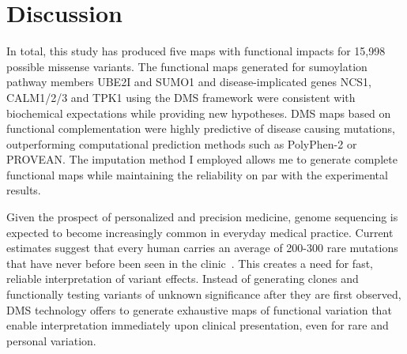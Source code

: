 \section{Discussion}
\label{ch2discussion}

In total, this study has produced five maps with functional impacts for 15,998 possible missense variants. The functional maps generated for sumoylation pathway members UBE2I and SUMO1 and disease-implicated genes NCS1, CALM1/2/3 and TPK1 using the DMS framework were consistent with biochemical expectations while providing new hypotheses. DMS maps based on functional complementation were highly predictive of disease causing mutations, outperforming computational prediction methods such as PolyPhen-2 or PROVEAN.  The imputation method I employed allows me to generate complete functional maps while maintaining the reliability on par with the experimental results. 

Given the prospect of personalized and precision medicine, genome sequencing is expected to become increasingly common in everyday medical practice. Current estimates suggest that every human carries an average of 200-300 rare mutations that have never before been seen in the clinic~\cite{the_1000_genomes_project_consortium_global_2015}. This creates a need for fast, reliable interpretation of variant effects. Instead of generating clones and functionally testing variants of unknown significance after they are first observed, DMS technology offers to generate exhaustive maps of functional variation that enable interpretation immediately upon clinical presentation, even for rare and personal variation.

